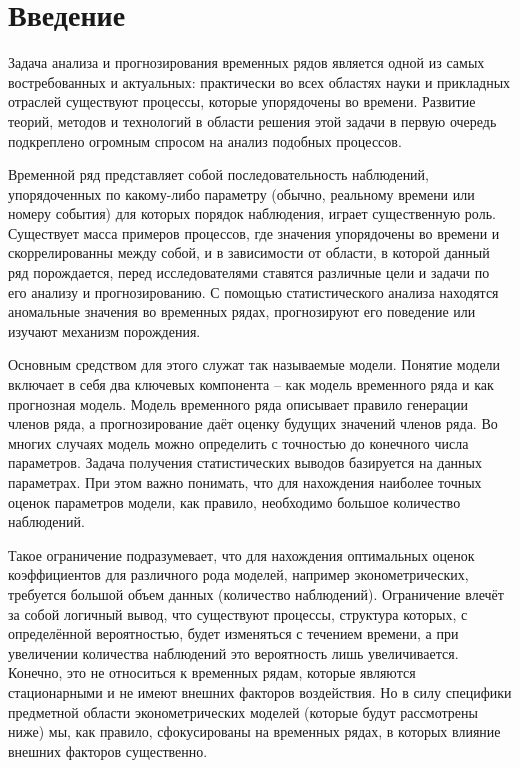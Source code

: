 \documentclass[a4paper,14pt,russian]{extarticle}
\begin{document}
	\section*{\label{sec:sec0}Введение}
	Задача анализа и прогнозирования временных рядов является одной из самых востребованных и актуальных: практически во всех областях науки и прикладных отраслей существуют процессы, которые упорядочены во времени. Развитие теорий, методов и технологий в области решения этой задачи в первую очередь подкреплено огромным спросом на анализ подобных процессов.
	\par
	Временной ряд представляет собой последовательность наблюдений, упорядоченных по какому-либо параметру (обычно, реальному времени или номеру события) для которых порядок наблюдения, играет существенную роль. Существует масса примеров процессов, где значения упорядочены во времени и скоррелированны между собой, и в зависимости от области, в которой данный ряд порождается, перед исследователями ставятся различные цели и задачи по его анализу и прогнозированию. С помощью статистического анализа находятся аномальные значения во временных рядах, прогнозируют его поведение или изучают механизм порождения.
	\par
	Основным средством для этого служат так называемые модели. Понятие модели включает в себя два ключевых компонента – как модель временного ряда и как прогнозная модель. Модель временного ряда описывает правило генерации членов ряда, а прогнозирование даёт оценку будущих значений членов ряда. Во многих случаях модель можно определить с точностью до конечного числа параметров. Задача получения статистических выводов базируется на данных параметрах. При этом важно понимать, что для нахождения наиболее точных оценок параметров модели, как правило, необходимо большое количество наблюдений.
	\par
	Такое ограничение подразумевает, что для нахождения оптимальных оценок коэффициентов для различного рода моделей, например эконометрических, требуется большой объем данных (количество наблюдений). Ограничение влечёт за собой логичный вывод, что существуют процессы, структура которых, с определённой вероятностью, будет изменяться с течением времени, а при увеличении количества наблюдений это вероятность лишь увеличивается. Конечно, это не относиться к временных рядам, которые являются стационарными и не имеют внешних факторов воздействия. Но в силу специфики предметной области эконометрических моделей (которые будут рассмотрены ниже) мы, как правило, сфокусированы на временных рядах, в которых влияние внешних факторов существенно.
\end{document}
